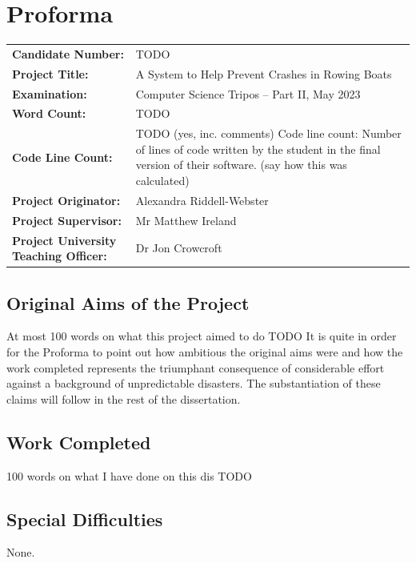 \documentclass[12pt,a4paper]{report}
\begin{document}
\chapter*{Proforma}

{\large
\begin{tabular}{ll}
\bf Candidate Number:   & TODO \\
\bf Project Title:  & A System to Help Prevent Crashes in Rowing Boats \\
\bf Examination:  & Computer Science Tripos -- Part II, May 2023      \\
\bf Word Count:    & TODO \footnotemark[1]   \\
\bf Code Line Count:    & TODO (yes, inc. comments) Code line count: Number of lines of code written by the student in the final version of their software. (say how this was calculated)\\
\bf Project Originator: & Alexandra Riddell-Webster                 \\
\bf Project Supervisor:         & Mr Matthew Ireland  \\ 
\bf Project University Teaching Officer:  & Dr Jon Crowcroft \\ 
\end{tabular}
}


\section*{Original Aims of the Project}
At most 100 words on what this project aimed to do
TODO
It is quite in order for the Proforma to point out how ambitious the original aims were and how the work completed represents the triumphant consequence of considerable effort against a background of unpredictable disasters. The substantiation of these claims will follow in the rest of the dissertation.

\section*{Work Completed}
100 words on what I have done on this dis
TODO

\section*{Special Difficulties}
None.
\end{document}
